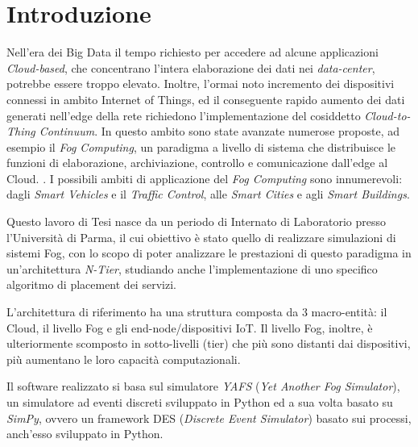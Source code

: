 \chapter*{Introduzione} %
\markboth{}{}

Nell'era dei Big Data il tempo richiesto per accedere ad alcune applicazioni \textit{Cloud-based}, che concentrano l'intera elaborazione dei dati nei \textit{data-center}, potrebbe essere troppo elevato. Inoltre, l'ormai noto incremento dei dispositivi connessi in ambito Internet of Things, ed il conseguente rapido aumento dei dati generati nell'edge della rete richiedono l'implementazione del cosiddetto \textit{Cloud-to-Thing Continuum}. In questo ambito sono state avanzate numerose proposte, ad esempio il \textit{Fog Computing}, un paradigma a livello di sistema che distribuisce le funzioni di elaborazione, archiviazione, controllo e comunicazione dall'edge al Cloud. \cite{OpenFogReferenceArchitecture}. I possibili ambiti di applicazione del \textit{Fog Computing} sono innumerevoli: dagli \textit{Smart Vehicles} e il \textit{Traffic Control}, alle \textit{Smart Cities} e agli \textit{Smart Buildings}.

Questo lavoro di Tesi nasce da un periodo di Internato di Laboratorio presso l'Università di Parma, il cui obiettivo è stato quello di realizzare simulazioni di sistemi Fog, con lo scopo di poter analizzare le prestazioni di questo paradigma in un'architettura \textit{N-Tier}, studiando anche l'implementazione di uno specifico algoritmo di placement dei servizi.

L'architettura di riferimento ha una struttura composta da 3 macro-entità: il Cloud, il livello Fog e gli end-node/dispositivi IoT. Il livello Fog, inoltre, è ulteriormente scomposto in sotto-livelli (tier) che più sono distanti dai dispositivi, più aumentano le loro capacità computazionali.

Il software realizzato si basa sul simulatore \textit{YAFS} (\textit{Yet Another Fog Simulator}), un simulatore ad eventi discreti sviluppato in Python ed a sua volta basato su \textit{SimPy}, ovvero un framework DES (\textit{Discrete Event Simulator}) basato sui processi, anch'esso sviluppato in Python.


